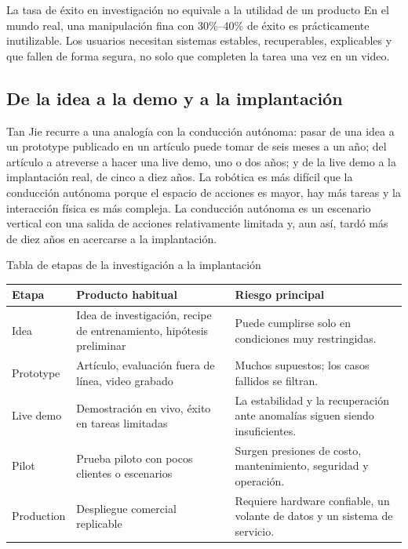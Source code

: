 \begin{warningbox}{La tasa de éxito en investigación no equivale a la utilidad de un producto}
En el mundo real, una manipulación fina con 30\%--40\% de éxito es prácticamente inutilizable. Los usuarios necesitan sistemas estables, recuperables, explicables y que fallen de forma segura, no solo que completen la tarea una vez en un video.
\end{warningbox}

\subsection{De la idea a la demo y a la implantación}

Tan Jie recurre a una analogía con la conducción autónoma: pasar de una idea a un prototype publicado en un artículo puede tomar de seis meses a un año; del artículo a atreverse a hacer una live demo, uno o dos años; y de la live demo a la implantación real, de cinco a diez años. La robótica es más difícil que la conducción autónoma porque el espacio de acciones es mayor, hay más tareas y la interacción física es más compleja. La conducción autónoma es un escenario vertical con una salida de acciones relativamente limitada y, aun así, tardó más de diez años en acercarse a la implantación.

\begin{knowledgebox}{Tabla de etapas de la investigación a la implantación}
\begin{tabularx}{\textwidth}{p{}p{}X}
\toprule
Etapa & Producto habitual & Riesgo principal \\
\midrule
Idea & Idea de investigación, recipe de entrenamiento, hipótesis preliminar & Puede cumplirse solo en condiciones muy restringidas. \\
Prototype & Artículo, evaluación fuera de línea, video grabado & Muchos supuestos; los casos fallidos se filtran. \\
Live demo & Demostración en vivo, éxito en tareas limitadas & La estabilidad y la recuperación ante anomalías siguen siendo insuficientes. \\
Pilot & Prueba piloto con pocos clientes o escenarios & Surgen presiones de costo, mantenimiento, seguridad y operación. \\
Production & Despliegue comercial replicable & Requiere hardware confiable, un volante de datos y un sistema de servicio. \\
\bottomrule
\end{tabularx}
\end{knowledgebox}

